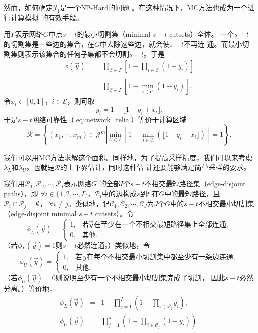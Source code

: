 然而，如何确定$\mathscr{Y}_1$是一个NP-Hard的问题
\cite{Provan1984Computing}。在这种情况下，MC方法也成为一个进行计算模拟
的有效手段。

用$\Gamma$表示网络$G$中点$s-t$的最小切割集（minimal $s-t$ cutsets）全体。
一个$s-t$的切割集是一些边的集合，在$G$中去除这些边，就会使$s-t$不再连
通。而最小切割集则表示该集合的任何子集都不会切割$s-t$。于是
$$
\begin{array}{rcl}
\displaystyle \phi(\vec{y}) &=& \displaystyle \prod_{\mathscr{C} \in
  \Gamma} \left[1 - \prod_{i \in \mathscr{C}}(1 - y_i)\right] \\\\ & =
& \displaystyle \prod_{\mathscr{C} \in \Gamma}\left[1 - \min_{i \in
    \mathscr{C}}(1 - y_i)\right].
\end{array}
$$
令$x_i \in [0, 1]$，$i \in \mathscr{E}$，则可取
$$
y_i = 1 - \lfloor 1 - q_i + x_i \rfloor.
$$
于是$s-t$网络可靠性（\ref{eq::network_relia}）等价于计算区域
$$
\mathscr{R} = \left\{(x_1, \cdots, x_m) \in \mathscr{J}^m
\left| \min_{\mathscr{C} \in \Gamma} \left[1
  - \min_{i \in \mathscr{C}}(\lfloor1 - q_i + x_i\rfloor)\right] = 1\right.\right\}.
$$

我们可以用MC方法求解这个面积。同样地，为了提高采样精度，我们可以来考虑
$\lambda_L$和$\lambda_U$。也就是$\mathscr{R}$的上下界估计，同时这种估
计还要能够满足简单采样的要求。

我们用$\mathscr{P}_1, \mathscr{P}_2, \cdots, \mathscr{P}_I$表示网络$G$
的全部$I$个$s-t$不相交最短路径集（edge-disjoint paths），即
$\forall i \in \{1, 2, \cdots, I\}$，$\mathscr{P}_i$中的边构成$s$到$t$
在$G$中的最短路径，且$\mathscr{P}_i \cap \mathscr{P}_j = \emptyset$，
$\forall i \neq j$。类似地，记$\mathscr{C}_1, \mathscr{C}_2, \cdots,
\mathscr{C}_J$为$J$个$G$中的$s-t$不相交最小切割集（edge-disjoint
  minimal $s-t$ cutsets）。令
$$
\phi_L(\vec{y}) = \left\{
\begin{array}{ll}
  1, & \mbox{若$\vec{y}$在至少在一个不相交最短路径集上全部连通},\\
  0, & \mbox{其他}.
\end{array}
\right.
$$
（若$\phi_L(\vec{y}) = 1$则$s-t$必然连通。）类似地，令
$$
\phi_U(\vec{y}) = \left\{
\begin{array}{ll}
  1, & \mbox{若$\vec{y}$在每个不相交最小切割集中都至少有一条边连通},\\
  0, & \mbox{其他}.
\end{array}
\right.
$$
（若$\phi_U(\vec{y}) = 0$则说明至少有一个不相交最小切割集完成了切割，
  因此$s-t$必然分离。）等价地，
\begin{equation}
  \begin{array}{rcl}
\phi_L(\vec{y}) &=& \displaystyle 1 - \prod_{j = 1}^I\left(1 - \prod_{i \in
  \mathscr{P}_j} y_i\right), \\
\phi_U(\vec{y}) &=& \displaystyle \prod_{j = 1}^J\left(1 - \prod_{i \in
  \mathscr{C}_j} (1 - y_i)\right).
  \end{array}
  \label{eq::network_phi_lu}
\end{equation}

